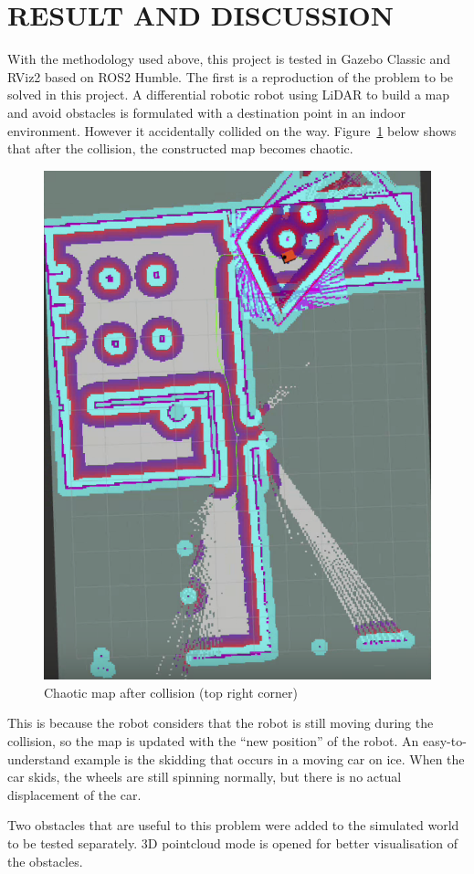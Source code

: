 \section{RESULT AND DISCUSSION}
\label{sec:result_and_discussion}
With the methodology used above, this project is tested in Gazebo Classic and RViz2 based on ROS2 Humble. 
The first is a reproduction of the problem to be solved in this project.
A differential robotic robot using LiDAR to build a map and avoid obstacles is formulated 
with a destination point in an indoor environment. However it accidentally collided on the way. 
Figure~\ref{fig:collision} below shows that after the collision, the constructed map becomes chaotic.
\begin{figure}[H]
    \centering
    \includegraphics[width=0.4\linewidth]{figs/chaotic_map.png}
    \caption{Chaotic map after collision (top right corner)}
    \label{fig:collision}
\end{figure}
This is because the robot considers that the robot is still moving during the collision,
so the map is updated with the ``new position'' of the robot. An easy-to-understand example is the skidding that occurs in a moving car on ice. 
When the car skids, the wheels are still spinning normally, but there is no actual displacement of the car.

Two obstacles that are useful to this problem were added to the simulated world to be tested separately.
3D pointcloud mode is opened for better visualisation of the obstacles.

